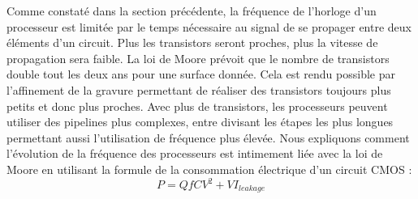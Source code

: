         Comme constaté dans la section précédente, la fréquence de l'horloge d'un processeur est limitée par le temps nécessaire au signal de se propager entre deux éléments d'un circuit. Plus les transistors seront proches, plus la vitesse de propagation sera faible. La loi de Moore prévoit que le nombre de transistors double tout les deux ans pour une surface donnée. Cela est rendu possible par l'affinement de la gravure permettant de réaliser des transistors toujours plus petits et donc plus proches. Avec plus de transistors, les processeurs peuvent utiliser des pipelines plus complexes, entre divisant les étapes les plus longues permettant aussi l'utilisation de fréquence plus élevée. Nous expliquons comment l'évolution de la fréquence des processeurs est intimement liée avec la loi de Moore en utilisant la formule de la consommation électrique d'un circuit CMOS \cite{martin2014post}:
        \begin{equation}
        P = QfCV^{2} +  VI_{leakage}
        \label{eq:power}
        \end{equation}
        
